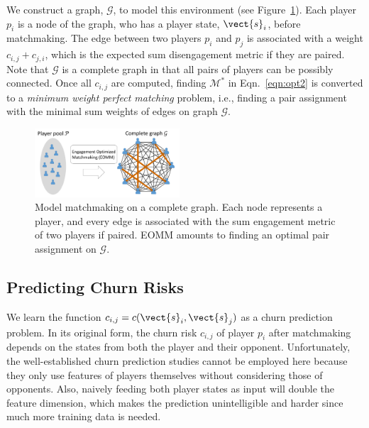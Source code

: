 
We construct a graph, $\mathcal{G}$, to model this environment (see Figure~\ref{fig:matching}). Each player $p_i$ is a node of the graph, who has a player state, $\vect{s}_i$, before matchmaking. The edge between two players $p_i$ and $p_j$ is associated with a weight $c_{i,j} + c_{j,i}$, which is the expected sum disengagement metric if they are paired. Note that $\mathcal{G}$ is a complete graph in that all pairs of players can be possibly connected. Once all $c_{i,j}$ are computed, finding $\mathcal{M}^*$ in Eqn.~\ref{eqn:opt2} is converted to a \emph{minimum weight perfect matching} problem, i.e., finding a pair assignment with the minimal sum weights of edges on graph $\mathcal{G}$.

\begin{figure}[tb]
\centering
\includegraphics[width=0.48\textwidth]{Figures/complete_matching.pdf}
\caption{Model matchmaking on a complete graph. Each node represents a player, and every edge is associated with the sum engagement metric of two players if paired. EOMM amounts to finding an optimal pair assignment on $\mathcal{G}$.}
\label{fig:matching}
\end{figure}


\subsection{Predicting Churn Risks}\label{sec:churn}
We learn the function $c_{i,j} = c(\vect{s}_i, \vect{s}_j)$ as a churn prediction problem. In its original form, the churn risk $c_{i,j}$ of player $p_i$ after matchmaking depends on the states from both the player and their opponent. Unfortunately, the well-established churn prediction studies cannot be employed here because  they only use features of players themselves without considering those of opponents. Also, naively feeding both player states as input will double the feature dimension, which makes the prediction unintelligible and harder since much more training data is needed. 

